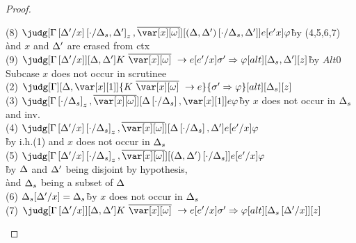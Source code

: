 \begin{proof}
\begin{description}
\begin{tabbing}
    (8) $\judg[\subst{\subst{\G}{\D'}{x}}{\cdot}{\D_s,\D'}_z,\ov{\xo}][\subst{(\D,\D')}{\cdot}{\D_s,\D'}]{e[e'x]}{\vp}$\` by (4,5,6,7)\\\` and $x$ and $\Delta'$ are erased from ctx\\
    (9) $\judg[\subst{\G}{\D'}{x}][\D,\D']{K~\ov{\xo}~\to e[e'/x]}{\s' \Rightarrow \vp}[alt][\D_s,\D'][z]$\` by $Alt0$\\
  Subcase $x$ does not occur in scrutinee\\
    (2) $\judg[\G][\D,\xl]{K~\ov{\xo}~\to e}{\s' \Rightarrow \vp}[alt][\D_s][z]$\\
    (3) $\judg[\subst{\G}{\cdot}{\D_s}_z,\ov{\xo}][\subst{\D}{\cdot}{\D_s},\xl]{e}{\vp}$\`by $x$ does not occur in $\Delta_s$ and inv.\\
    (4) $\judg[\subst{\subst{\G}{\D'}{x}}{\cdot}{\D_s}_z,\ov{\xo}][\subst{\D}{\cdot}{\D_s},\D']{e[e'/x]}{\vp}$\\\`by i.h.(1) and $x$ does not occur in $\Delta_s$\\
    (5) $\judg[\subst{\subst{\G}{\D'}{x}}{\cdot}{\D_s}_z,\ov{\xo}][\subst{(\D,\D')}{\cdot}{\D_s}]{e[e'/x]}{\vp}$\\
    \`by $\Delta$ and $\Delta'$ being disjoint by hypothesis,\\
    \`and $\Delta_s$ being a subset of $\Delta$\\ %
    (6) $\Delta_s[\Delta'/x] = \Delta_s$\`by $x$ does not occur in $\Delta_s$\\
    (7) $\judg[\subst{\G}{\D'}{x}][\D,\D']{K~\ov{\xo}~\to e[e'/x]}{\s' \Rightarrow \vp}[alt][\subst{\D_s}{\D'}{x}][z]$\\
\end{tabbing}


\end{description}

\end{proof}

